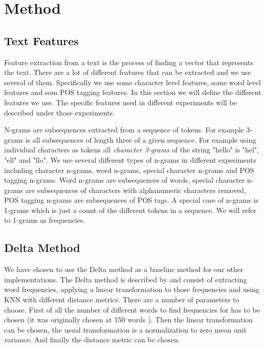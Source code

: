 \section{Method}

\subsection{Text Features}
Feature extraction from a text is the process of finding a vector that
represents the text. There are a lot of different features that can be extracted
and we use several of them. Specifically we use some character level features,
some word level features and som \gls{POS} tagging features. In this section
we will define the different features we use. The specific features used in
different experiments will be described under those experiments.

N-grams are subsequences extracted from a sequence of tokens. For example
3-grams is all subsequences of length three of a given sequence. For example
using individual characters as tokens all \textit{character 3-grams} of the
string "hello" is "hel", "ell" and "llo". We use several different types of
n-grams in different experiments including character n-grams, word n-grams,
special character n-grams and \gls{POS} tagging n-grams. Word n-grams are
subsequences of words, special character n-grams are subsequences of characters
with alphanumeric characters removed, \gls{POS} tagging n-grams are subsequences
of \gls{POS} tags. A special case of n-grams is 1-grams which is just a count of
the different tokens in a sequence. We will refer to 1-grams as frequencies.

\subsection{Delta Method}
We have chosen to use the Delta method as a baseline method for our other
implementations. The Delta method is described by \cite{evert2015towards} and
consist of extracting word frequencies, applying a linear transformation to
those frequencies and using \gls{KNN} with different distance metrics. There are
a number of parameters to choose. First of all the number of different words to
find frequencies for has to be chosen (it was originally chosen at 150 words
\cite{evert2015towards}). Then the linear transformation can be chosen, the
usual transformation is a normalization to zero mean unit variance. And finally
the distance metric can be chosen.

